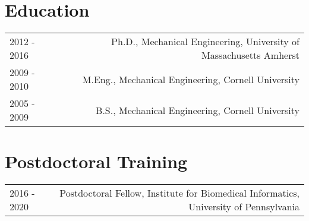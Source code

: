 \section*{Education}
\begin{tabular}{L!{\VRule}R}
2012 - 2016& Ph.D., Mechanical Engineering, University of Massachusetts Amherst\\
2009 - 2010& M.Eng., Mechanical Engineering, Cornell University \\
2005 - 2009& B.S., Mechanical Engineering, Cornell University 
\end{tabular}

\section*{Postdoctoral Training}
\begin{tabular}{L!{\VRule}R}
2016 - 2020 & Postdoctoral Fellow, Institute for Biomedical Informatics, University of Pennsylvania 
\end{tabular}
